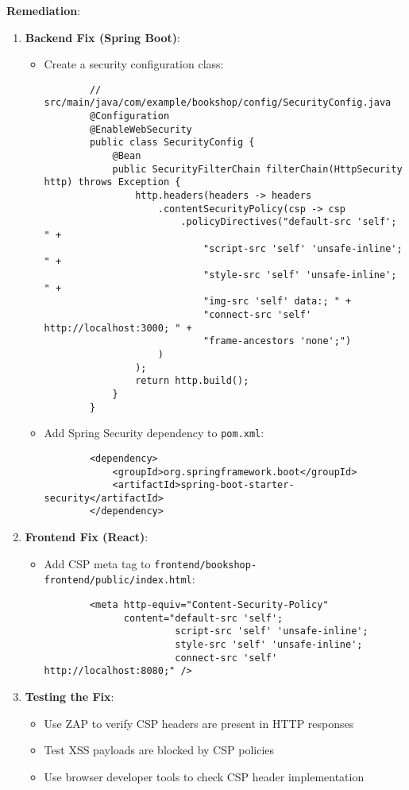 \documentclass[]{UCD_CS_FYP_Report}
\begin{document}
\textbf{Remediation}:
\begin{enumerate}
    \item \textbf{Backend Fix (Spring Boot)}:
    \begin{itemize}
        \item Create a security configuration class:
        \begin{verbatim}
        // src/main/java/com/example/bookshop/config/SecurityConfig.java
        @Configuration
        @EnableWebSecurity
        public class SecurityConfig {
            @Bean
            public SecurityFilterChain filterChain(HttpSecurity http) throws Exception {
                http.headers(headers -> headers
                    .contentSecurityPolicy(csp -> csp
                        .policyDirectives("default-src 'self'; " +
                            "script-src 'self' 'unsafe-inline'; " +
                            "style-src 'self' 'unsafe-inline'; " +
                            "img-src 'self' data:; " +
                            "connect-src 'self' http://localhost:3000; " +
                            "frame-ancestors 'none';")
                    )
                );
                return http.build();
            }
        }
        \end{verbatim}
        
        \item Add Spring Security dependency to \texttt{pom.xml}:
        \begin{verbatim}
        <dependency>
            <groupId>org.springframework.boot</groupId>
            <artifactId>spring-boot-starter-security</artifactId>
        </dependency>
        \end{verbatim}
    \end{itemize}
    
    \item \textbf{Frontend Fix (React)}:
    \begin{itemize}
        \item Add CSP meta tag to \texttt{frontend/bookshop-frontend/public/index.html}:
        \begin{verbatim}
        <meta http-equiv="Content-Security-Policy" 
              content="default-src 'self'; 
                       script-src 'self' 'unsafe-inline'; 
                       style-src 'self' 'unsafe-inline'; 
                       connect-src 'self' http://localhost:8080;" />
        \end{verbatim}
    \end{itemize}
    
    \item \textbf{Testing the Fix}:
    \begin{itemize}
        \item Use ZAP to verify CSP headers are present in HTTP responses
        \item Test XSS payloads are blocked by CSP policies
        \item Use browser developer tools to check CSP header implementation
    \end{itemize}
\end{enumerate}
\end{document}

